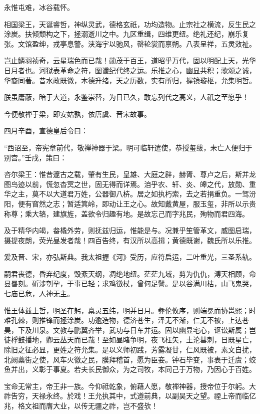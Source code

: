 \documentclass[12pt,UTF8]{ctexbook}
\begin{document}
永惟屯难，冰谷载怀。

相国梁王，天诞睿哲，神纵灵武，德格玄祇，功均造物。止宗社之横流，反生民之涂炭。扶倾颓构之下，拯溺逝川之中。九区重缉，四维更纽。绝礼还纪，崩乐复张。文馆盈绅，戎亭息警。浃海宇以驰风，罄轮裳而禀朔。八表呈祥，五灵效祉。

岂止鳞羽祯奇，云星瑞色而已哉！勋茂于百王，道昭乎万代，固以明配上天，光华日月者也。河狱表革命之符，图谶纪代终之运。乐推之心，幽显共积；歌颂之诚，华裔同著。昔水政既微，木德升绪，天之历数，实有所归，握镜璇枢，允集明哲。

朕虽庸蔽，暗于大道，永鉴崇替，为日已久，敢忘列代之高义，人祇之至愿乎！

今便敬禅于梁，即安姑孰，依唐虞、晋宋故事。

四月辛酉，宣德皇后令曰：

“西诏至，帝宪章前代，敬禅神器于梁。明可临轩遣使，恭授玺绂，未亡人便归于别宫。”壬戌，策曰：

咨尔梁王：惟昔邃古之载，肇有生民，皇雄、大庭之辟，赫胥、尊卢之后，斯并龙图鸟迹以前，慌忽杳冥之世，固无得而详焉。洎乎农、轩、炎、皞之代，放勋、重华之主，莫不以大道君万姓，公器御八枿。居之如执朽索，去之若捐重负。一驾汾阳，便有窅然之志；暂适箕岭，即动让王之心。故知戴黄屋，服玉玺，非所以示贵称尊；乘大辂，建旗旌，盖欲令归趣有地。是故忘己而字兆民，殉物而君四海。

及于精华内竭，畚橇外劳，则抚兹归运，惟能是与。况兼乎笙管革文，威图启瑞，摄提夜朗，荧光昼发者哉！四百告终，有汉所以高揖；黄德既谢，魏氏所以乐推。

爰及晋、宋，亦弘斯典。我太祖握《河》受历，应符启运，二叶重光，三圣系轨。

嗣君丧德，昏弃纪度，毁紊天纲，凋绝地纽。茫茫九域，剪为仇仇，溥天相顾，命县晷刻。斫涉刳孕，于事已轻；求鸡徵杖，曾何足譬。是以谷满川枯，山飞鬼哭，七庙已危，人神无主。

惟王体兹上哲，明圣在躬，禀灵五纬，明并日月。彝伦攸序，则端冕而协邕熙；时难孔棘，则推锋而拯涂炭。功逾造物，德济苍生，泽无不渐，仁无不被，上达苍昊，下及川泉。文教与鹏翼齐举，武功与日车并运。固以幽显宅心，讴讼斯属；岂徒桴鼓播地，卿云丛天而已哉！至如昼睹争明，夜飞枉矢，土沦彗刺，日既星亡，除旧之征必显，更姓之符允集。是以义师初践，芳露凝甘，仁风既被，素文自扰，北阙藁街之使，风车火徼之民，膜拜稽首，愿为臣妾。钟石毕变，事表于迁虞；蛟鱼并出，义彰于事夏。若夫长民御众，为之司牧，本同己于万物，乃因心于百姓。

宝命无常主，帝王非一族。今仰祗乾象，俯藉人愿，敬禅神器，授帝位于尔躬。大祚告穷，天禄永终。於戏！王允执其中，式遵前典，以副昊天之望。禋上帝而临亿兆，格文祖而膺大业，以传无疆之祚，岂不盛欤！
\end{document}

